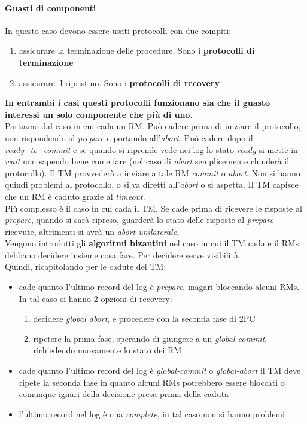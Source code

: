 \documentclass[a4paper,12pt, oneside]{book}
\begin{document}
\paragraph{Guasti di componenti}
In questo caso devono essere usati protocolli con due compiti:
\begin{enumerate}
  \item assicurare la terminazione delle procedure. Sono i \textbf{protocolli di
  terminazione}
\item assicurare il ripristino. Sono i \textbf{protocolli di recovery}
\end{enumerate}
\textbf{In entrambi i casi questi protocolli funzionano sia che il guasto
  interessi un solo componente che più di uno}.\\
Partiamo dal caso in cui cada un RM. Può cadere prima di iniziare il protocollo,
non rispondendo al \textit{prepare} e portando all'\textit{abort}. Può cadere
dopo il \textit{ready\_to\_commit} e se quando si riprende vede nei log lo stato
\textit{ready} si mette in \textit{wait} non sapendo bene come fare (nel caso di
\textit{abort} semplicemente chiuderà il protocollo). Il TM
provvederà a inviare a tale RM \textit{commit} o \textit{abort}. Non si hanno
quindi problemi al protocollo, o si va diretti all'\textit{abort} o si
aspetta. Il TM capisce che un RM è caduto grazie al \textit{timeout}.\\
Più complesso è il caso in cui cada il TM. Se cade prima di ricevere le risposte
al \textit{prepare}, quando si sarà ripreso, guarderà lo stato delle risposte al
\textit{prepare} ricevute, altrimenti si avrà un \textit{abort unilaterale}. \\
Vengono introdotti gli \textbf{algoritmi bizantini} nel caso in cui il TM cada e
il RMs debbano decidere insieme cosa fare. Per decidere serve visibilità.\\
Quindi, ricapitolando per le cadute del TM:
\begin{itemize}
  \item cade quanto l'ultimo record del log è \textit{prepare}, magari bloccando
  alcuni RMs. In tal caso si hanno 2 opzioni di recovery:
  \begin{enumerate}
    \item decidere \textit{global abort}, e procedere con la seconda fase di 2PC
    \item ripetere la prima fase, sperando di giungere a un \textit{global
      commit}, richiedendo nuovamente lo stato dei RM
  \end{enumerate}
  \item cade quanto l'ultimo record del log è \textit{global-commit} o
  \textit{global-abort} il TM deve ripete la seconda fase in quanto alcuni RMs
  potrebbero essere bloccati o comunque ignari della decisione presa prima della
  caduta
  \item l’ultimo record nel log è una \textit{complete}, in tal caso non si
  hanno problemi
\end{itemize}
\end{document}
